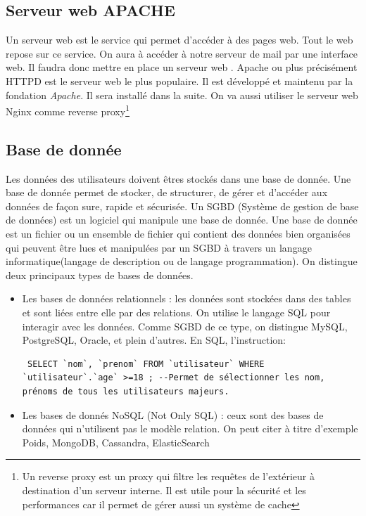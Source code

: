 \documentclass[a4paper,12pt,french]{report} %
\begin{document}
\subsection{Serveur web APACHE}
Un serveur web est le service qui permet d'accéder à des pages web. Tout le web repose sur ce service. On aura à accéder à notre serveur de mail par une interface web. Il faudra donc mettre en place un serveur web . Apache ou plus précisément HTTPD est le serveur web le plus populaire. Il est développé et maintenu par la fondation \emph{Apache}. Il sera installé dans la suite. On va aussi utiliser le serveur web Nginx comme reverse proxy\footnote{Un reverse proxy est un proxy qui filtre les requêtes de l'extérieur à destination d'un serveur interne. Il est utile pour la sécurité et les performances car il permet de gérer aussi un système de cache}

\subsection{Base de donnée}
Les données des utilisateurs doivent êtres stockés dans une base de donnée. Une base de donnée permet de stocker, de structurer, de gérer et d'accéder aux données de façon sure, rapide et sécurisée. Un SGBD (Système de gestion de base de données) est un logiciel qui manipule une base de donnée. Une base de donnée est un fichier ou un ensemble de fichier qui contient des données bien organisées qui peuvent être lues et manipulées par un SGBD à travers un langage informatique(langage de description ou de langage programmation). On distingue deux principaux types de bases de données.
 \begin{itemize}
 \item Les bases de données relationnels : les données sont stockées dans des tables et sont liées entre elle par des relations. On utilise le langage SQL pour interagir avec les données. Comme SGBD de ce type, on distingue MySQL, PostgreSQL, Oracle, et plein d'autres. En SQL, l'instruction: 
 \begin{verbatim}
 SELECT `nom`, `prenom` FROM `utilisateur` WHERE `utilisateur`.`age` >=18 ; --Permet de sélectionner les nom, prénoms de tous les utilisateurs majeurs.
 \end{verbatim}
 \item Les bases de donnés NoSQL (Not Only SQL) : ceux sont des bases de données qui n'utilisent pas le modèle relation. On  peut citer à titre d'exemple Poids, MongoDB, Cassandra, ElasticSearch
 \end{itemize}
 
\end{document}
